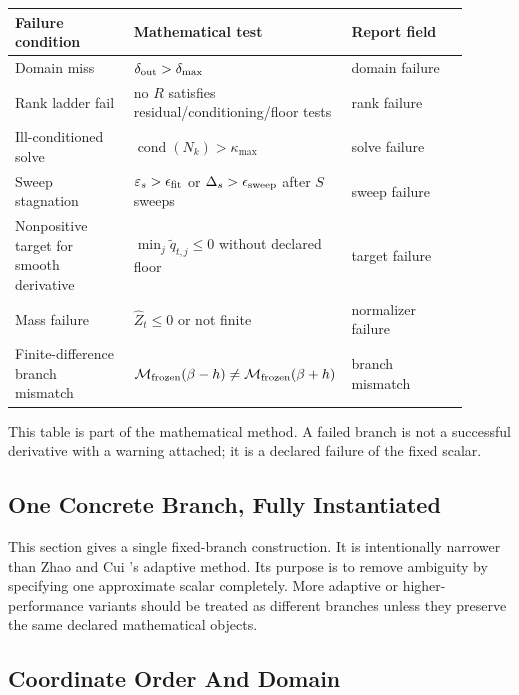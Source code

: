 \documentclass[11pt]{article}
\numberwithin{equation}{section}
\begin{document}
\begin{center}
\begin{tabular}{p{0.28\linewidth}p{0.34\linewidth}p{0.28\linewidth}}
\toprule
Failure condition & Mathematical test & Report field\\
\midrule
Domain miss &
\(\delta_{\rm out}>\delta_{\max}\) &
domain failure\\
Rank ladder fail &
no \(R\) satisfies residual/conditioning/floor tests &
rank failure\\
Ill-conditioned solve &
\(\operatorname{cond}(N_k)>\kappa_{\max}\) &
solve failure\\
Sweep stagnation &
\(\varepsilon_s>\epsilon_{\rm fit}\) or \(\Delta_s>\epsilon_{\rm sweep}\) after \(S\) sweeps &
sweep failure\\
Nonpositive target for smooth derivative &
\(\min_j\widetilde q_{t,j}\le0\) without declared floor &
target failure\\
Mass failure &
\(\widehat Z_t\le0\) or not finite &
normalizer failure\\
Finite-difference branch mismatch &
\(\mathcal M_{\rm frozen}(\beta-h)\ne\mathcal M_{\rm frozen}(\beta+h)\) &
branch mismatch\\
\bottomrule
\end{tabular}
\end{center}

This table is part of the mathematical method.  A failed branch is not a
successful derivative with a warning attached; it is a declared failure of the
fixed scalar.

\subsection{One Concrete Branch, Fully Instantiated}

This section gives a single fixed-branch construction.  It is intentionally narrower
than Zhao and Cui \cite{zhao2024ttsequential}'s adaptive method.  Its purpose is
to remove ambiguity by specifying one approximate scalar completely.  More
adaptive or higher-performance variants should be treated as different branches
unless they preserve the same declared mathematical objects.

\subsection{Coordinate Order And Domain}
\end{document}
